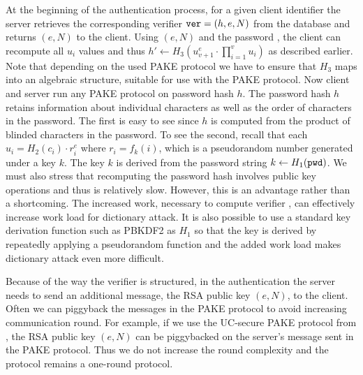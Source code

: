 At the beginning of the authentication process, for a given client identifier the server retrieves the corresponding verifier $\mathtt{ver}=(h, e, N)$ from the database and returns $(e,N)$ to the client.
Using $(e,N)$ and the password \pwd, the client can recompute all $u_i$ values and thus $h'\gets H_3(u_{v+1}^e\cdot\prod_{i=1}^{v}u_i)$ as described earlier.
Note that depending on the used PAKE protocol we have to ensure that $H_3$ maps into an algebraic structure, suitable for use with the PAKE protocol.
Now client and server run any PAKE protocol on password hash $h$. The password hash $h$ retains information about individual characters as well as the order of characters in the password. The first is easy to see since $h$ is computed from the product of blinded characters in the password.  
To see the second, recall that each $u_i=H_2(c_i)\cdot r_i^e$ where $r_i=f_k(i)$, which is a pseudorandom number generated under a key $k$. 
The key $k$ is derived from the password string $k\gets H_1(\mathtt{pwd})$. 
We must also stress that recomputing the password hash involves public key operations and thus is relatively slow.
However, this is an advantage rather than a shortcoming. 
The increased work, necessary to compute verifier \ver, can effectively increase work load for dictionary attack. 
It is also possible to use a standard key derivation function such as PBKDF2 \cite{rfc2898} as $H_1$ so that the key is derived by repeatedly applying a pseudorandom function and the added work load makes dictionary attack even more difficult.

Because of the way the verifier is structured, in the authentication the server needs to send an additional message, the RSA public key $(e,N)$, to the client. Often we can piggyback the messages in the PAKE protocol to avoid increasing communication round. 
For example, if we use the UC-secure PAKE protocol from \citet{Benhamouda2013}, the RSA public key $(e,N)$ can be piggybacked on the server's message sent in the PAKE protocol. Thus we do not increase the round complexity and the protocol remains a one-round protocol.
